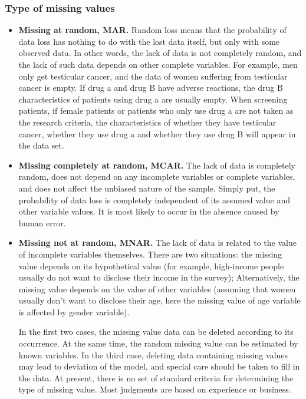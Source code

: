 \subsubsection{Type of missing values}
\begin{itemize}
\item \textbf{Missing at random, MAR.}
Random loss means that the probability of data loss has nothing to do with the lost data itself, but only with some observed data. In other words, the lack of data is not completely random, and the lack of such data depends on other complete variables. For example, men only get testicular cancer, and the data of women suffering from testicular cancer is empty. If drug a and drug B have adverse reactions, the drug B characteristics of patients using drug a are usually empty. When screening patients, if female patients or patients who only use drug a are not taken as the research criteria, the characteristics of whether they have testicular cancer, whether they use drug a and whether they use drug B will appear in the data set.

\item \textbf{Missing completely at random, MCAR.}
The lack of data is completely random, does not depend on any incomplete variables or complete variables, and does not affect the unbiased nature of the sample. Simply put, the probability of data loss is completely independent of its assumed value and other variable values. It is most likely to occur in the absence caused by human error.

\item \textbf{Missing not at random, MNAR.}
The lack of data is related to the value of incomplete variables themselves. There are two situations: the missing value depends on its hypothetical value (for example, high-income people usually do not want to disclose their income in the survey); Alternatively, the missing value depends on the value of other variables (assuming that women usually don't want to disclose their age, here the missing value of age variable is affected by gender variable).

In the first two cases, the missing value data can be deleted according to its occurrence. At the same time, the random missing value can be estimated by known variables. In the third case, deleting data containing missing values may lead to deviation of the model, and special care should be taken to fill in the data. At present, there is no set of standard criteria for determining the type of missing value. Most judgments are based on experience or business.
\end{itemize}


